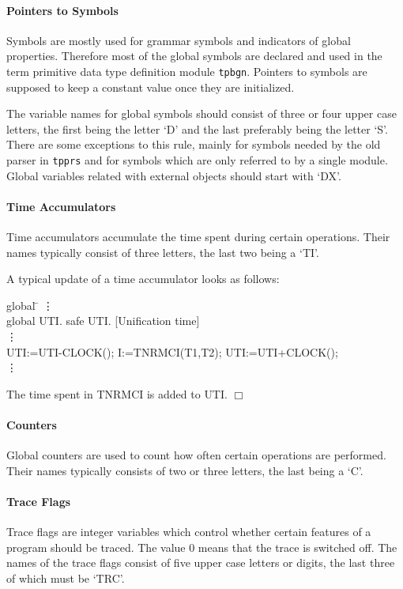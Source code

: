 \paragraph{Pointers to Symbols}
Symbols are mostly used for grammar symbols and indicators of global
properties.
Therefore most of the global symbols are declared and used in the term primitive
data type definition module {\tt tpbgn}.
Pointers to symbols are supposed to keep a constant value once they are 
initialized.

The variable names for global symbols should consist of three or four upper 
case letters, the first being the letter `D' and the last preferably being 
the letter `S'.
There are some exceptions to this rule, mainly for symbols needed by the old
parser in {\tt tpprs} and for symbols which are only referred to by a single 
module.
Global variables related with external objects
should start with `DX'.

\paragraph{Time Accumulators}
Time accumulators accumulate the time spent during certain operations.
Their names typically consist of  three letters, the last two being a `TI'.
\begin{example}
 A typical update of a time accumulator looks as follows:
 
 \begin{tabbing}
  global \= \kill
  \> \vdots \\
  global \> UTI. safe UTI. [Unification time] \\
       \> \vdots \\
       \> UTI:=UTI-CLOCK(); I:=TNRMCI(T1,T2); UTI:=UTI+CLOCK(); \\
       \> \vdots
 \end{tabbing}
 
 The time spent in TNRMCI is added to UTI. \hfill $\Box$
\end{example}

\paragraph{Counters}
Global counters are used to count how often certain operations are performed.
Their names typically consists of two or three letters, the last being a `C'.

\paragraph{Trace Flags}
Trace flags are integer variables which control whether certain features
of a program should be traced.
The value 0 means that the trace is switched off.
The names of the trace flags consist of five upper case letters or digits,
the last three of which must be `TRC'.

